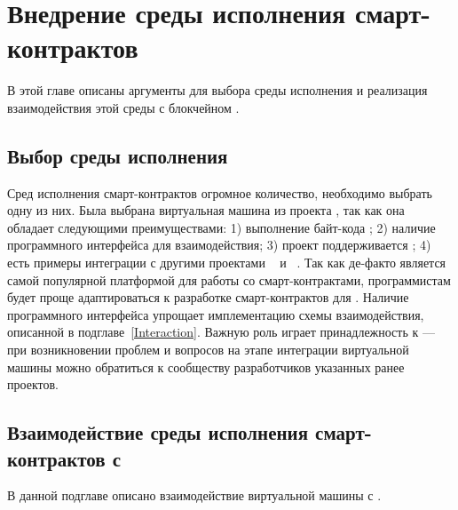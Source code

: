 \section{Внедрение среды исполнения смарт-кон\-трак\-тов}
В этой главе описаны аргументы для выбора среды исполнения и реализация взаимодействия этой среды с блокчейном .

\subsection{Выбор среды исполнения}
Сред исполнения смарт-контрактов огромное количество, необходимо выбрать одну из них.
Была выбрана виртуальная машина из проекта , так как она обладает следующими преимуществами: 1) выполнение байт-кода ; 2) наличие программного интерфейса для взаимодействия; 3) проект поддерживается ; 4) есть примеры интеграции с другими проектами ~\cite{HLFabricEVM} и ~\cite{HLSeth}.
Так как  де-факто является самой популярной платформой для работы со смарт-контрактами, программистам будет проще адаптироваться к разработке смарт-контрактов для .
Наличие программного интерфейса упрощает имплементацию схемы взаимодействия, описанной в подглаве~\ref{Interaction}.
Важную роль играет принадлежность к  --- при возникновении проблем и вопросов на этапе интеграции виртуальной машины можно обратиться к сообществу разработчиков указанных ранее проектов.

\subsection{Взаимодействие среды исполнения смарт-кон\-трак\-тов с }
В данной подглаве описано взаимодействие виртуальной машины  с .

